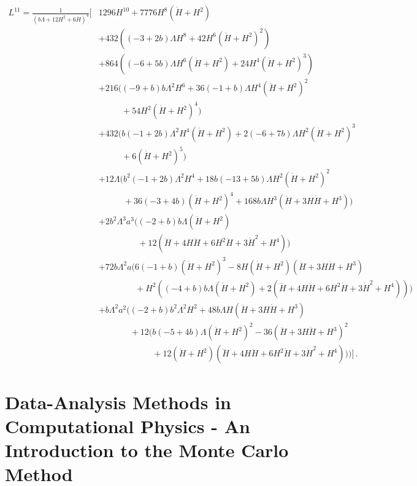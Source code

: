 \documentclass{book}
\begin{document}
	\begin{equation}
		\begin{aligned}
			L^{11}=\frac{1}{\left( b \Lambda + 12 H^2 + 6 \dot{H} \right)^4} \Big[
			&1296 H^{10} + 7776 H^8 (\dot{H} + H^2) \\
			&+ 432 \left( (-3 + 2b) \Lambda H^8 + 42 H^6 (\dot{H} + H^2)^2 \right) \\
			&+ 864 \left( (-6 + 5b) \Lambda H^6 (\dot{H} + H^2) + 24 H^4 (\dot{H} + H^2)^3 \right) \\
			&+ 216 \Big( (-9 + b) b \Lambda^2 H^6 + 36 (-1 + b) \Lambda H^4 (\dot{H} + H^2)^2 \\
			&\phantom{+ 216 \Big( } + 54 H^2 (\dot{H} + H^2)^4 \Big) \\
			&+ 432 \Big( b (-1 + 2b) \Lambda^2 H^4 (\dot{H} + H^2) + 2 (-6 + 7b) \Lambda H^2 (\dot{H} + H^2)^3 \\
			&\phantom{+ 432 \Big( } + 6 (\dot{H} + H^2)^5 \Big) \\
			&+ 12 \Lambda \Big( b^2 (-1 + 2b) \Lambda^2 H^4 + 18 b (-13 + 5b) \Lambda H^2 (\dot{H} + H^2)^2 \\
			&\phantom{+ 12 \Lambda \Big( } + 36 (-3 + 4b) (\dot{H} + H^2)^4 + 168 b \Lambda H^3 (\ddot{H} + 3H\dot{H} + H^3) \Big) \\
			&+ 2 b^2 \Lambda^3 a^3 \Big( (-2 + b) b \Lambda (\dot{H} + H^2) \\
			&\phantom{+ 2 b^2 \Lambda^3 a^3 \Big( } + 12 (\ddddot{H} + 4H\ddot{H} + 6H^2\dot{H} + 3\dot{H}^2 + H^4) \Big) \\
			&+ 72 b \Lambda^2 a \Big( 6 (-1 + b) (\dot{H} + H^2)^3 - 8 H (\dot{H} + H^2) (\ddot{H} + 3H\dot{H} + H^3) \\
			&\phantom{+ 72 b \Lambda^2 a \Big( } + H^2 \left( (-4 + b) b \Lambda (\dot{H} + H^2) + 2 (\ddddot{H} + 4H\ddot{H} + 6H^2\dot{H} + 3\dot{H}^2 + H^4) \right) \Big) \\
			&+ b \Lambda^2 a^2 \Big( (-2 + b) b^2 \Lambda^2 H^2 + 48 b \Lambda H (\ddot{H} + 3H\dot{H} + H^3) \\
			&\phantom{+ b \Lambda^2 a^2 \Big( } + 12 \Big( b (-5 + 4b) \Lambda (\dot{H} + H^2)^2 - 36 (\ddot{H} + 3H\dot{H} + H^3)^2 \\
			&\phantom{+ b \Lambda^2 a^2 \Big( + 12 \Big( } + 12 (\dot{H} + H^2) (\ddddot{H} + 4H\ddot{H} + 6H^2\dot{H} + 3\dot{H}^2 + H^4) \Big) \Big)
			\Big] \, .
		\end{aligned}
	\end{equation}
	
	
	\chapter{Data-Analysis Methods in Computational Physics - An Introduction to the Monte Carlo Method}
\end{document}

